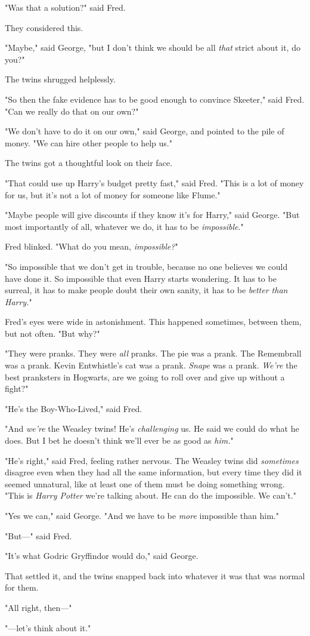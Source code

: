 "Was that a solution?" said Fred.

They considered this.

"Maybe," said George, "but I don't think we should be all \emph{that} strict
about it, do you?"

The twins shrugged helplessly.

"So then the fake evidence has to be good enough to convince Skeeter," said
Fred. "Can we really do that on our own?"

"We don't have to do it on our own," said George, and pointed to the pile of
money. "We can hire other people to help us."

The twins got a thoughtful look on their face.

"That could use up Harry's budget pretty fast," said Fred. "This is a lot of
money for us, but it's not a lot of money for someone like Flume."

"Maybe people will give discounts if they know it's for Harry," said George.
"But most importantly of all, whatever we do, it has to be \emph{impossible}."

Fred blinked. "What do you mean, \emph{impossible?}"

"So impossible that we don't get in trouble, because no one believes we could
have done it. So impossible that even Harry starts wondering. It has to be
surreal, it has to make people doubt their own sanity, it has to be{\el}
\emph{better than Harry.}"

Fred's eyes were wide in astonishment. This happened sometimes, between them,
but not often. "But why?"

"They were pranks. They were \emph{all} pranks. The pie was a prank. The
Remembrall was a prank. Kevin Entwhistle's cat was a prank. \emph{Snape} was a
prank. \emph{We're} the best pranksters in Hogwarts, are we going to roll over
and give up without a fight?"

"He's the Boy-Who-Lived," said Fred.

"And \emph{we're} the Weasley twins! He's \emph{challenging} us. He said we
could do what he does. But I bet he doesn't think we'll ever be as good as
\emph{him.}"

"He's right," said Fred, feeling rather nervous. The Weasley twins did
\emph{sometimes} disagree even when they had all the same information, but
every time they did it seemed unnatural, like at least one of them must be
doing something wrong. "This is \emph{Harry Potter} we're talking about. He can
do the impossible. We can't."

"Yes we can," said George. "And we have to be \emph{more} impossible than him."

"But\mbox{---}" said Fred.

"It's what Godric Gryffindor would do," said George.

That settled it, and the twins snapped back into{\el} whatever it was that
was normal for them.

"All right, then\mbox{---}"

"---let's think about it."
